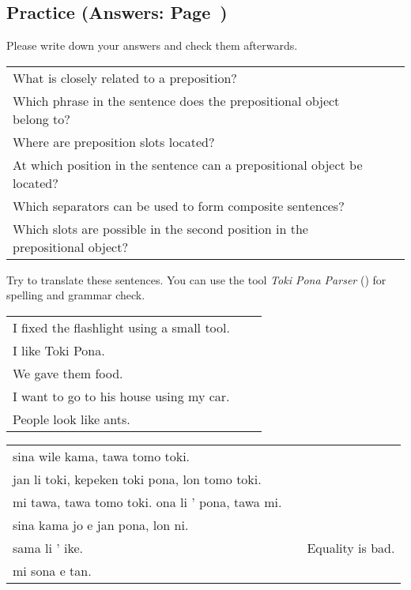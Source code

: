 \subsection*{Practice (Answers: Page~\pageref{'prepositional_objects'})}
%
Please write down your answers and check them afterwards. 

\begin{supertabular}{p{5,5cm}|ll}
What is closely related to a preposition?  &&  \\ %
Which phrase in the sentence does the prepositional object belong to?  &&   \\ %
Where are preposition slots located?  &&   \\ %
At which position in the sentence can a prepositional object be located? &&  \\ %
Which separators can be used to form composite sentences?  &&   \\ %
Which slots are possible in the second position in the prepositional object?  &&   \\ %
\end{supertabular}

Try to translate these sentences. 
You can use the tool \textit{Toki Pona Parser} (\cite{www:rowa:02}) for spelling and grammar check. 

\begin{supertabular}{p{5,5cm}|ll}
I fixed the flashlight using a small tool.  &&  \\  %
I like Toki Pona.  &&  \\  %
We gave them food.  &&  \\ %
I want to go to his house using my car.  &&  \\  %
People look like ants. && \\ %
\end{supertabular}

\begin{supertabular}{p{5,5cm}|ll}
sina wile kama, tawa tomo toki.  &&  \\ %
jan li toki, kepeken toki pona, lon tomo toki.  &&  \\ %
mi tawa, tawa tomo toki. ona li ' pona, tawa mi.  &&  \\ %
sina kama jo e jan pona, lon ni.  &&  \\ %
sama li ' ike. && Equality is bad. \\ %
mi sona e tan. &&  \\ %
\end{supertabular} 

%

